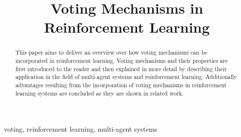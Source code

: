 \documentclass[conference]{IEEEtran}
\begin{document}
\title{Voting Mechanisms in Reinforcement Learning}

\author{
}

\maketitle


\begin{abstract}
This paper aims to deliver an overview over how voting mechanisms can be incorporated in reinforcement learning.
Voting mechanisms and their properties are first introduced to the reader and then explained in more detail by describing their application in the field of multi-agent systems and reinforcement learning.
Additionally advantages resulting from the incorporation of voting mechanisms in reinforcement learning systems are concluded as they are shown in related work.
\end{abstract}

\begin{IEEEkeywords}
voting, reinforcement learning, multi-agent systems
\end{IEEEkeywords}

\end{document}
